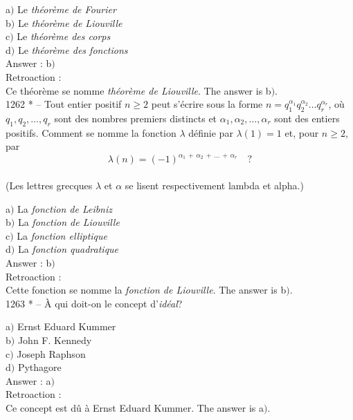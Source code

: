 ﻿\documentclass[letterpaper, 12pt]{article}
\begin{document}
a$)$ Le {\sl th\'eor\`eme de Fourier} \\
b$)$ Le {\sl th\'eor\`eme de Liouville} \\
c$)$ Le {\sl th\'eor\`eme des corps} \\
d$)$ Le {\sl th\'eor\`eme des fonctions}\\

Answer : b$)$\\

Retroaction : \\
Ce th\'eor\`eme se nomme {\sl th\'eor\`eme de Liouville}.
The answer is b$)$.\\

1262 * -- Tout entier positif $n\ge2$ peut s'\'ecrire sous la forme
$n=q_1^{\alpha_1}q_2^{\alpha_2}\ldots q_r^{\alpha_r}$, o\`u
$q_1,q_2,\ldots,q_r$ sont des nombres premiers distincts et
$\alpha_1,\alpha_2,\ldots,\alpha_r$ sont des entiers positifs.
Comment se nomme la fonction $\lambda$ d\'efinie par $\lambda(1)=1$
et, pour $n\ge2$, par
$$\lambda(n)=(-1)^{\alpha_1\,+\,\alpha_2\,+\,\ldots\,+\,\alpha_r}\quad?$$\\
(Les lettres grecques $\lambda$ et $\alpha$ se lisent respectivement
lambda et alpha.)

a$)$ La {\sl fonction de Leibniz} \\
b$)$ La {\sl fonction de Liouville} \\
c$)$ La {\sl fonction elliptique} \\
d$)$ La {\sl fonction quadratique}\\

Answer : b$)$\\

Retroaction : \\
Cette fonction se nomme la {\sl fonction de Liouville}.
The answer is b$)$.\\

1263 * -- \`A qui doit-on le concept d'{\sl id\'eal}?

a$)$ Ernst Eduard Kummer \\
b$)$ John F. Kennedy \\
c$)$ Joseph Raphson \\
d$)$ Pythagore\\

Answer : a$)$\\

Retroaction : \\
Ce concept est d\^u \`a Ernst Eduard Kummer.
The answer is a$)$.\\
\end{document}
